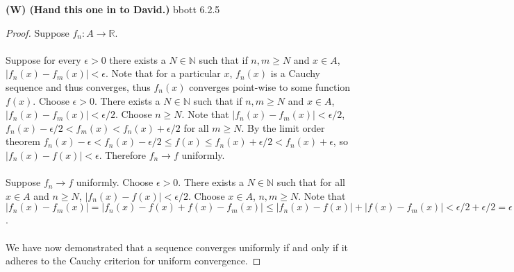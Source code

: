 \documentclass[12pt]{article}
\makeatletter
\theoremstyle{homework}
\newenvironment{exercise}[1]
{\def\@currentlabel{#1}\exercisecore}
{\endexercisecore}
\newcommand\W{{\color{red}\textbf{(W) (Hand this one in to David.)}}}
\makeatother
\begin{document}
\newpage
\W
\begin{exercise}

Abbott 6.2.5
\end{exercise}
\begin{proof}
Suppose $f_n:A\rightarrow\mathbb{R}$.\\\\
Suppose for every $\epsilon>0$ there exists a $N\in\mathbb{N}$ such that if $n,m\geq N$ and $x\in A$, $|f_n(x)-f_m(x)|<\epsilon$.  Note that for a particular $x$, $f_n(x)$ is a Cauchy sequence and thus converges, thus $f_n(x)$ converges point-wise to some function $f(x)$.  Choose $\epsilon>0$.  There exists a $N\in\mathbb{N}$ such that if $n,m\geq N$ and $x\in A$, $|f_n(x)-f_m(x)|<\epsilon/2$.  Choose $n\geq N$.  Note that $|f_n(x)-f_m(x)|<\epsilon/2$, $f_n(x)-\epsilon/2<f_m(x)<f_n(x)+\epsilon/2$ for all $m\geq N$.  By the limit order theorem $f_n(x)-\epsilon<f_n(x)-\epsilon/2\leq f(x)\leq f_n(x)+\epsilon/2<f_n(x)+\epsilon$, so $|f_n(x)-f(x)|<\epsilon$.  Therefore $f_n\rightarrow f$ uniformly.\\\\
Suppose $f_n\rightarrow f$ uniformly.  Choose $\epsilon>0$.  There exists a $N\in\mathbb{N}$ such that for all $x\in A$ and $n\geq N$, $|f_n(x)-f(x)|<\epsilon/2$.  Choose $x\in A$, $n,m\geq N$.  Note that $|f_n(x)-f_m(x)|=|f_n(x)-f(x)+f(x)-f_m(x)|\leq |f_n(x)-f(x)|+|f(x)-f_m(x)|<\epsilon/2+\epsilon/2=\epsilon$.\\\\
We have now demonstrated that a sequence converges uniformly if and only if it adheres to the Cauchy criterion for uniform convergence.
\end{proof}
\end{document}
